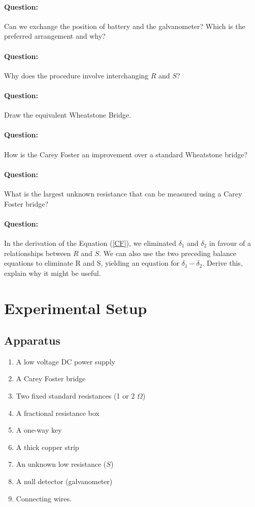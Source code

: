 \begin{question}
\paragraph{Question:} Can we exchange the position of battery and the galvanometer? Which is the preferred arrangement and why?
\paragraph{Question:} Why does the procedure involve interchanging $R$ and $S$?
\paragraph{Question:} Draw the equivalent Wheatstone Bridge.
\paragraph{Question:} How is the Carey Foster an improvement over a standard Wheatstone bridge?
\paragraph{Question:} What is the largest unknown resistance that can be measured using a Carey Foster bridge?
\paragraph{Question:} In the derivation of the Equation (\ref{CF}), we eliminated $\delta_1$ and $\delta_2$ in favour of a relationships between $R$ and $S$. We can also use the two preceding balance equations to eliminate R and S, yielding an equation for $\delta_1 - \delta_2$. Derive this, explain why it might be useful.
\end{question}


\section*{Experimental Setup}

\subsection*{Apparatus}

\begin{enumerate}
\item A low voltage DC power supply
\item A Carey Foster bridge
\item Two fixed standard resistances (1 or 2 $\Omega$)
\item A fractional resistance box
\item A one-way key
\item A thick copper strip
\item An unknown low resistance ($S$)
\item A null detector (galvanometer)
\item Connecting wires.
\end{enumerate}


